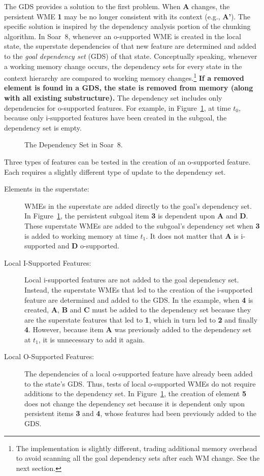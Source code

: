 The GDS provides a solution to the first problem.  When {\bf A}
changes, the persistent WME {\bf 1} may be no longer consistent with
its context (e.g., {\bf A'}).  The specific solution is inspired by
the dependency analysis portion of the chunking algorithm.  In Soar~8, whenever an o-supported WME is
created in the local state, the superstate dependencies of that new
feature are determined and added to the {\em goal dependency set}
(GDS) of that state. Conceptually speaking, whenever a working memory
change occurs, the dependency sets for every state in the context
hierarchy are compared to working memory changes.\footnote{The
implementation is slightly different, trading additional memory
overhead to avoid scanning all the goal dependency sets after each WM
change.  See the next section.  }  \textbf{If a removed element is found in a
GDS, the state is removed from memory (along with all existing
substructure).} The dependency set includes only dependencies for
o-supported features.  For example, in Figure~\ref{'gds'}, at time
$t_0$, because only i-supported features have been created in the
subgoal, the dependency set is empty.

\begin{figure}
\caption{The Dependency Set in Soar~8.}
\label{'gds'}
\end{figure}


Three types of features can be tested in the creation of an
o-supported feature.  Each requires a slightly different type of
update to the dependency set.
\begin{description}
\item [Elements in the superstate:] WMEs in the superstate are added
directly to the goal's dependency set.  In Figure~\ref{'gds'}, the
persistent subgoal item {\bf 3} is dependent upon {\bf A} and {\bf
D}. These superstate WMEs are added to the subgoal's dependency set when
{\bf 3} is added to working memory at time $t_1$.  It does not matter
that {\bf A} is i-supported and {\bf D} o-supported.
\item [Local I-Supported Features:] Local i-supported features are not
added to the goal dependency set.  Instead, the superstate WMEs that
led to the creation of the i-supported feature are determined and
added to the GDS.  In the example, when {\bf 4} is created, {\bf A},
{\bf B} and {\bf C} must be added to the dependency set because they
are the superstate features that led to {\bf 1}, which in turn led to
{\bf 2} and finally {\bf 4}.  However, because item {\bf A} was
previously added to the dependency set at $t_1$, it is unnecessary to
add it again.
\item [Local O-Supported Features:] The dependencies of a local
o-supported feature have already been added to the state's GDS.  Thus,
tests of local o-supported WMEs do not require additions to the
dependency set.  In Figure~\ref{'gds'}, the creation of element {\bf
5} does not change the dependency set because it is dependent only
upon persistent items {\bf 3} and {\bf 4}, whose features had been
previously added to the GDS.
\end{description}

